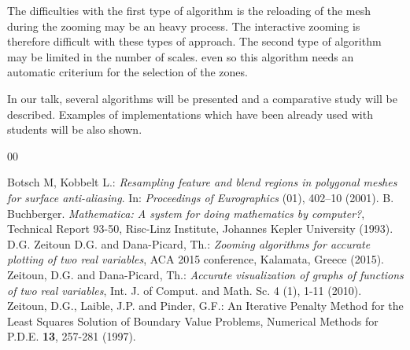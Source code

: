\documentclass[11pt]{article}
\begin{document}
The difficulties with the first type of algorithm is the reloading of the mesh during the zooming may be an heavy process. The interactive zooming is therefore difficult with these types of approach.
The second type of algorithm may be limited in the number of scales. even so this algorithm needs an automatic criterium for the selection of the zones.

In our talk, several algorithms will be presented and a comparative study will be described. Examples of implementations which have been already used with students will be also shown.


\begin{thebibliography}{00}
\setlength{\itemsep}{-1mm}
\footnotesize
{}  Botsch M, Kobbelt L.: \emph{Resampling feature and blend regions in polygonal meshes for surface anti-aliasing}. In:
\emph{Proceedings of Eurographics} (01), 402--10 (2001).
 B. Buchberger. \emph{Mathematica: A system for doing mathematics by computer?}, Technical Report 93-50, Risc-Linz Institute, Johannes Kepler University (1993).
 D.G. Zeitoun D.G. and Dana-Picard, Th.: \textit{Zooming algorithms for accurate plotting of two real variables},  ACA 2015 conference, Kalamata, Greece (2015).
 Zeitoun, D.G. and Dana-Picard, Th.:   \emph{Accurate visualization of graphs of functions of two real variables},  Int. J. of Comput. and Math. Sc. 4 (1), 1-11 (2010).
 Zeitoun, D.G., Laible, J.P. and Pinder, G.F.: An Iterative Penalty Method for the Least Squares Solution of Boundary Value Problems,  Numerical Methods for P.D.E. \textbf{13}, 257-281 (1997).



\end{thebibliography}
\normalsize
\end{document}
